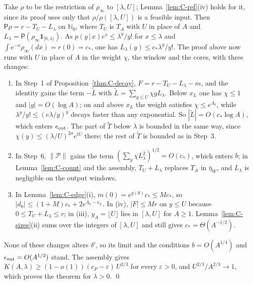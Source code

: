Take $\rho$ to be the restriction of $\rho_\infty$ to $[\lambda,U]$; Lemma~\ref{lem:C-ref}(iv) holds for it, since its proof uses only
that $\rho/\rho([\lambda,U])$ is a feasible input. Then $\mathsf P\rho=r-T_U-L_\lambda$ on $\mathbb N_0$, where $T_U$ is $T_A$ with $U$ in place
of $A$ and $L_\lambda=\mathsf P(\rho_\infty\mathbf 1_{[0,\lambda)})$. As $p(y\,|\,x)e^x\le\lambda^y/y!$ for
$x\le\lambda$ and $\int e^{-x}\rho_\infty(dx)=r(0)=c_*$, one has $L_\lambda(y)\le c_*\lambda^y/y!$. The proof above now runs with $U$ in
place of $A$ in the weight $\chi$, the window and the cores, with three changes:
\begin{enumerate}
\item In Step~1 of Proposition~\ref{thm:C-decay}, $F=r-T_U-L_\lambda-m$, and the identity gains the term $-\tilde L$ with
$\tilde L=\sum_{y\le U}\chi gL_\lambda$. Below $x_L$ one has $\chi\le1$ and $|g|=O(\log A)$; on and above $x_L$ the weight satisfies $\chi\le e^{\Lambda_0}$, while
$\lambda^y/y!\le(e\lambda/y)^y$ decays faster than any exponential. So $|\tilde L|=O(c_*\log A)$, which enters $\epsilon_{\rm out}$.
The part of $\tilde T$ below $\lambda$ is bounded in the same way, since $\chi(y)\le(\lambda/U)^{2\sigma}e^{tU}$ there; the rest of
$\tilde T$ is bounded as in Step~3.
\item In Step~6, $\|\mathcal P\|$ gains the term $(\sum_y\chi L_\lambda^2)^{1/2}=O(c_*)$, which enters $b$; in Lemma~\ref{lem:C-count} and
the assembly, $T_U+L_\lambda$ replaces $T_A$ in $\bar\eta_W$, and $L_\lambda$ is negligible on the output windows.
\item In Lemma~\ref{lem:C-edge}(i), $m(0)=e^{g(0)}c_*\le Mc_*$, so $|d_0|\le(1+M)c_*+2e^{\Lambda_0-x_L}$. In (iv), $|F|\le Mr$ on
$y\le U$ because $0\le T_U+L_\lambda\le r$; in (iii), $y_A=\lfloor U\rfloor$ lies in $[\lambda,U]$ for $A\ge1$. Lemma~\ref{lem:C-sizes}(ii)
sums over the integers of $[\lambda,U]$ and still gives $c_*=\Theta(A^{-1/2})$.
\end{enumerate}
None of these changes alters $\delta'$, so its limit and the conditions $b=O(A^{1/4})$ and $\epsilon_{\rm out}=O(A^{1/2})$ stand. The
assembly gives $K(A,\lambda)\ge(1-o(1))(c_P-\varepsilon)\,U^{2/3}$ for every $\varepsilon>0$, and $U^{2/3}/A^{2/3}\to1$, which proves the
theorem for $\lambda>0$. \qed
